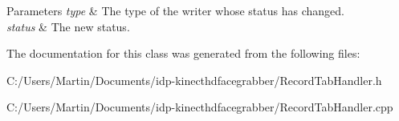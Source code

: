 \begin{DoxyParams}{Parameters}
{\em type} & The type of the writer whose status has changed. \\
\hline
{\em status} & The new status. \\
\hline
\end{DoxyParams}


The documentation for this class was generated from the following files\+:\begin{DoxyCompactItemize}
\item 
C\+:/\+Users/\+Martin/\+Documents/idp-\/kinecthdfacegrabber/Record\+Tab\+Handler.\+h\item 
C\+:/\+Users/\+Martin/\+Documents/idp-\/kinecthdfacegrabber/Record\+Tab\+Handler.\+cpp\end{DoxyCompactItemize}
